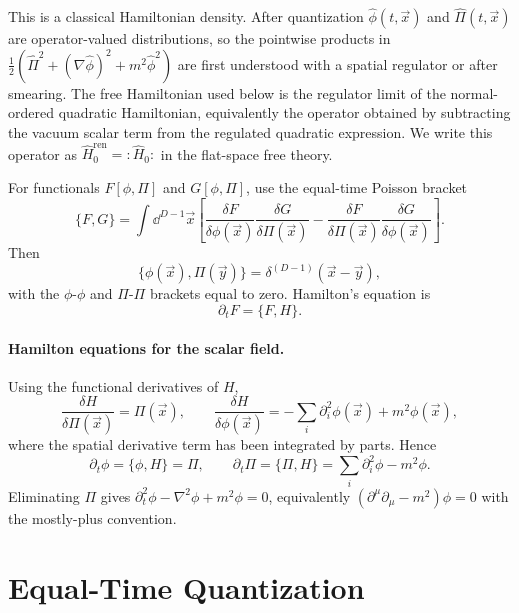This is a classical Hamiltonian density.  After quantization
\(\widehat\phi(t,\vec x)\) and \(\widehat\Pi(t,\vec x)\) are
operator-valued distributions, so the pointwise products in
\(\frac12(\widehat\Pi^2+(\nabla\widehat\phi)^2+m^2\widehat\phi^2)\) are first
understood with a spatial regulator or after smearing.  The free Hamiltonian
used below is the regulator limit of the normal-ordered quadratic Hamiltonian,
equivalently the operator obtained by subtracting the vacuum scalar term from
the regulated quadratic expression.  We write this operator as
\(\widehat H_0^{\mathrm{ren}}=:\widehat H_0:\) in the flat-space free theory.

\begin{definition}
\label{def:equal-time-scalar-poisson-bracket}
For functionals \(F[\phi,\Pi]\) and \(G[\phi,\Pi]\), use the equal-time
Poisson bracket
\[
  \{F,G\}
  =
  \int\dd^{D-1}\vec x
  \left[
    \frac{\delta F}{\delta\phi(\vec x)}
    \frac{\delta G}{\delta\Pi(\vec x)}
    -
    \frac{\delta F}{\delta\Pi(\vec x)}
    \frac{\delta G}{\delta\phi(\vec x)}
  \right].
\]
Then
\[
  \{\phi(\vec x),\Pi(\vec y)\}
  =
  \delta^{(D-1)}(\vec x-\vec y),
\]
with the \(\phi\)-\(\phi\) and \(\Pi\)-\(\Pi\) brackets equal to zero. Hamilton's
equation is
\[
  \partial_tF=\{F,H\}.
\]
\end{definition}

\paragraph{Hamilton equations for the scalar field.}
Using the functional derivatives of \(H\),
\[
  \frac{\delta H}{\delta\Pi(\vec x)}=\Pi(\vec x),
  \qquad
  \frac{\delta H}{\delta\phi(\vec x)}
  =
  -\sum_i\partial_i^2\phi(\vec x)+m^2\phi(\vec x),
\]
where the spatial derivative term has been integrated by parts.  Hence
\[
  \partial_t\phi=\{\phi,H\}=\Pi,
  \qquad
  \partial_t\Pi=\{\Pi,H\}
  =
  \sum_i\partial_i^2\phi-m^2\phi.
\]
Eliminating \(\Pi\) gives
\(\partial_t^2\phi-\nabla^2\phi+m^2\phi=0\), equivalently
\((\partial^\mu\partial_\mu-m^2)\phi=0\) with the mostly-plus convention.

\section{Equal-Time Quantization}

